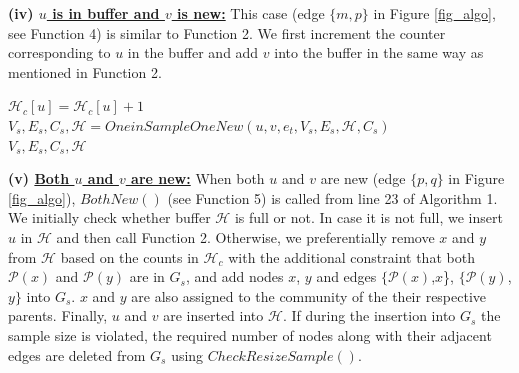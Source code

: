 \noindent\textbf{(iv) \underline{$u$ is in buffer and $v$ is new:}} This case (edge $\{m,p\}$ in Figure \ref{fig_algo}, see Function 4) is similar to Function 2. We first increment the counter corresponding to $u$ in the buffer and add $v$ into the buffer in the same way as mentioned in Function 2.
\vspace{-3mm}
\begin{function4}[!h]
\caption{$OneinBufferOneNew(u,v,e_t,V_s,E_s,\mathcal{H},C_s)$}
$\mathcal{H}_c[u]=\mathcal{H}_c[u]+1$\\
$V_s,E_s,C_s,\mathcal{H} = OneinSampleOneNew(u,v,e_t,V_s,E_s,\mathcal{H},C_s)$\\
\Return $V_s,E_s,C_s,\mathcal{H}$  %
\end{function4}

\noindent\textbf{(v) \underline{Both $u$ and $v$ are new:}}
When both $u$ and $v$ are new (edge $\{p,q\}$ in Figure \ref{fig_algo}), $BothNew()$ (see Function 5) is called from line 23 of Algorithm 1. We initially check whether buffer $\mathcal{H}$ is full or not. In case it is not full, we insert $u$ in $\mathcal{H}$ and then call Function 2. Otherwise, we preferentially remove $x$ and $y$ from $\mathcal{H}$ based on the counts in $\mathcal{H}_c$ with the additional constraint that both $\mathcal{P}(x)$ and $\mathcal{P}(y)$ are in $G_s$, and add nodes $x$, $y$ and edges $\{\mathcal{P}(x)$,$x$\}, $\{\mathcal{P}(y)$,$y\}$ into $G_s$. $x$ and $y$ are also assigned to the community of the their respective parents. Finally, $u$ and $v$ are inserted into $\mathcal{H}$. If during the insertion into $G_s$ the sample size is violated, the required number of nodes along with their adjacent edges are deleted from $G_s$ using $CheckResizeSample()$.


